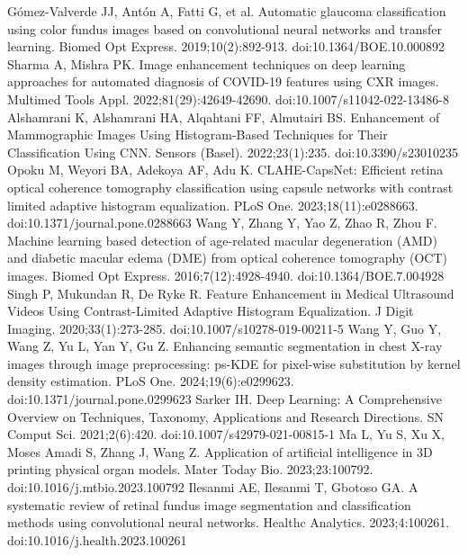 \documentclass{article}
\begin{document}
\begin{thebibliography}{99.}
 Gómez-Valverde JJ, Antón A, Fatti G, et al. Automatic glaucoma classification using color fundus images based on convolutional neural networks and transfer learning. Biomed Opt Express. 2019;10(2):892-913. doi:10.1364/BOE.10.000892
 Sharma A, Mishra PK. Image enhancement techniques on deep learning approaches for automated diagnosis of COVID-19 features using CXR images. Multimed Tools Appl. 2022;81(29):42649-42690. doi:10.1007/s11042-022-13486-8
 Alshamrani K, Alshamrani HA, Alqahtani FF, Almutairi BS. Enhancement of Mammographic Images Using Histogram-Based Techniques for Their Classification Using CNN. Sensors (Basel). 2022;23(1):235. doi:10.3390/s23010235
 Opoku M, Weyori BA, Adekoya AF, Adu K. CLAHE-CapsNet: Efficient retina optical coherence tomography classification using capsule networks with contrast limited adaptive histogram equalization. PLoS One. 2023;18(11):e0288663. doi:10.1371/journal.pone.0288663
 Wang Y, Zhang Y, Yao Z, Zhao R, Zhou F. Machine learning based detection of age-related macular degeneration (AMD) and diabetic macular edema (DME) from optical coherence tomography (OCT) images. Biomed Opt Express. 2016;7(12):4928-4940. doi:10.1364/BOE.7.004928
 Singh P, Mukundan R, De Ryke R. Feature Enhancement in Medical Ultrasound Videos Using Contrast-Limited Adaptive Histogram Equalization. J Digit Imaging. 2020;33(1):273-285. doi:10.1007/s10278-019-00211-5
 Wang Y, Guo Y, Wang Z, Yu L, Yan Y, Gu Z. Enhancing semantic segmentation in chest X-ray images through image preprocessing: ps-KDE for pixel-wise substitution by kernel density estimation. PLoS One. 2024;19(6):e0299623. doi:10.1371/journal.pone.0299623
 Sarker IH. Deep Learning: A Comprehensive Overview on Techniques, Taxonomy, Applications and Research Directions. SN Comput Sci. 2021;2(6):420. doi:10.1007/s42979-021-00815-1
 Ma L, Yu S, Xu X, Moses Amadi S, Zhang J, Wang Z. Application of artificial intelligence in 3D printing physical organ models. Mater Today Bio. 2023;23:100792. doi:10.1016/j.mtbio.2023.100792
 Ilesanmi AE, Ilesanmi T, Gbotoso GA. A systematic review of retinal fundus image segmentation and classification methods using convolutional neural networks. Healthc Analytics. 2023;4:100261. doi:10.1016/j.health.2023.100261

\end{thebibliography}
\end{document}
